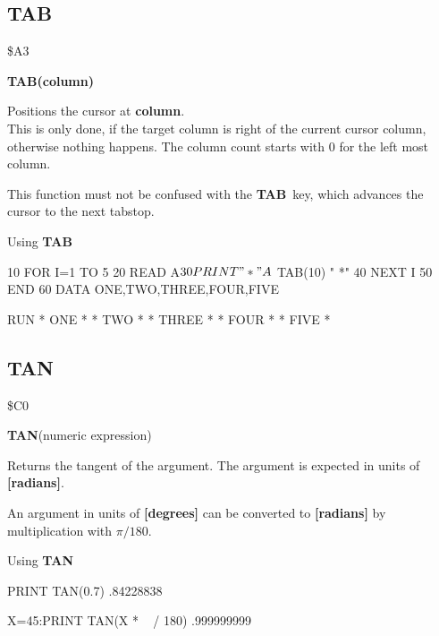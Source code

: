 
\newpage
\subsection{TAB}
\begin{description}[leftmargin=3cm,style=nextline]
\item [Token:] \$A3
\item [Format:] {\bf TAB(column)}
\item [Usage:] Positions the cursor at {\bf column}. \\
               This is only done, if the target column is right
               of the current cursor column, otherwise nothing
               happens. The column count starts with 0 for the
               left most column.

\item [Remarks:] This function must not be confused with the
               {\bf TAB} key, which advances the cursor to the next
               tabstop.

\item [Example:] Using {\bf TAB}
\begin{screenoutput}
10 FOR I=1 TO 5
20 READ A$
30 PRINT "* " A$ TAB(10) " *"
40 NEXT I
50 END
60 DATA ONE,TWO,THREE,FOUR,FIVE

RUN
* ONE      *
* TWO      *
* THREE    *
* FOUR     *
* FIVE     *
\end{screenoutput}
\end{description}


\newpage
\subsection{TAN}
\begin{description}[leftmargin=3cm,style=nextline]
\item [Token:] \$C0
\item [Format:] {\bf TAN}(numeric expression)
\item [Usage:] Returns the tangent of the
               argument.
               The argument is expected in units of {\bf [radians]}.

\item [Remarks:] An argument in units of {\bf [degrees]}
                 can be converted to {\bf [radians]}
               by multiplication with $\pi/180$.
\item [Example:] Using {\bf TAN}
\begin{screenoutput}
  PRINT TAN(0.7)
   .84228838

  X=45:PRINT TAN(X * ~ / 180)
   .999999999
\end{screenoutput}
\end{description}

